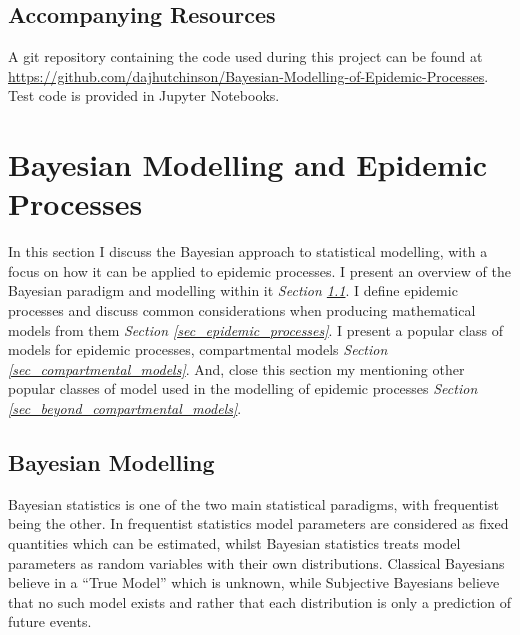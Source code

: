 \documentclass[11pt,a4paper]{article}
\theoremstyle{break}
\begin{document}
\subsection{Accompanying Resources}\label{sec_accompanying_resources}

  A git repository containing the code used during this project can be found at \url{https://github.com/dajhutchinson/Bayesian-Modelling-of-Epidemic-Processes}. Test code is provided in Jupyter Notebooks.

\newpage
\section{Bayesian Modelling and Epidemic Processes}\label{sec_bayesian_modelling_and_epidemic_processes}

  In this section I discuss the Bayesian approach to statistical modelling, with a focus on how it can be applied to epidemic processes. I present an overview of the Bayesian paradigm and modelling within it \textit{Section \ref{sec_bayesian_modelling}}. I define epidemic processes and discuss common considerations when producing mathematical models from them \textit{Section \ref{sec_epidemic_processes}}. I present a popular class of models for epidemic processes, compartmental models \textit{Section \ref{sec_compartmental_models}}. And, close this section my mentioning other popular classes of model used in the modelling of epidemic processes \textit{Section \ref{sec_beyond_compartmental_models}}.

\subsection{Bayesian Modelling}\label{sec_bayesian_modelling}

  \par Bayesian statistics is one of the two main statistical paradigms, with frequentist being the other. In frequentist statistics model parameters are considered as fixed quantities which can be estimated, whilst Bayesian statistics treats model parameters as random variables with their own distributions. Classical Bayesians believe in a ``True Model'' which is unknown, while Subjective Bayesians believe that no such model exists and rather that each distribution is only a prediction of future events.
\end{document}
